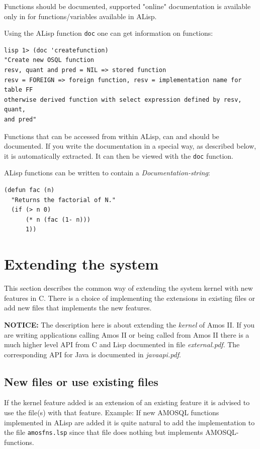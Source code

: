 Functions should be documented, supported "online" documentation 
is available only in for functions/variables available in ALisp.

Using the ALisp function {\tt doc} one can get information on
functions:

\begin{verbatim}
lisp 1> (doc 'createfunction)
"Create new OSQL function
resv, quant and pred = NIL => stored function
resv = FOREIGN => foreign function, resv = implementation name for table FF
otherwise derived function with select expression defined by resv, quant,
and pred"
\end{verbatim}

Functions that can be accessed from within ALisp, can and should
be documented. If you write the documentation in a special way,
as described below, it is automatically extracted. It can then
be viewed with the {\tt doc} function.

ALisp functions can be written to contain a {\em Documentation-string}:

\begin{verbatim}
(defun fac (n)
  "Returns the factorial of N."
  (if (> n 0)
      (* n (fac (1- n)))
      1))
\end{verbatim}

\section{Extending the system}
This section describes the common way of extending the system kernel
with new features in C. There is a choice of implementing the
extensions in existing files or add new files that implements the new
features.

{\bf NOTICE:} The description here is about extending the {\em kernel}
of Amos II. If you are writing applications calling Amos II or being
called from Amos II there is a much higher level API from C and Lisp
documented in file {\em external.pdf}. The corresponding API for Java
is documented in {\em javaapi.pdf}.

\subsection{New files or use existing files}
If the kernel feature added is an extension of an existing feature it is
advised to use the file(s) with that feature. Example: If new AMOSQL
functions implemented in ALisp are added it is quite natural to add
the implementation to the file {\tt amosfns.lsp} since that file does
nothing but implements AMOSQL-functions.


